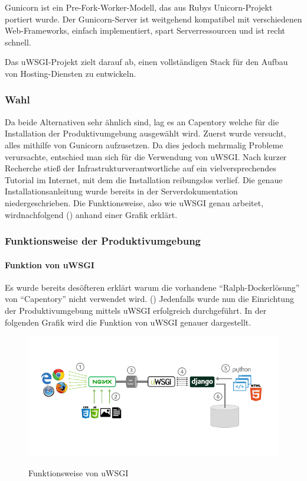 Gunicorn ist ein Pre-Fork-Worker-Modell\cite{prefork}, das aus Rubys
Unicorn-Projekt portiert wurde. Der Gunicorn-Server ist weitgehend
kompatibel mit verschiedenen Web-Frameworks, einfach implementiert,
spart Serverressourcen und ist recht schnell.

Das uWSGI-Projekt zielt darauf ab, einen vollständigen Stack für den
Aufbau von Hosting-Diensten zu entwickeln.

\hypertarget{wahl}{%
\subsubsection{Wahl}\label{wahl}}

Da beide Alternativen sehr ähnlich sind, lag es an Capentory welche für
die Installation der Produktivumgebung ausgewählt wird. Zuerst wurde
versucht, alles mithilfe von Gunicorn aufzusetzen. Da dies jedoch
mehrmalig Probleme verursachte, entschied man sich für die Verwendung
von uWSGI. Nach kurzer Recherche stieß der Infrastrukturverantwortliche
auf ein vielversprechendes Tutorial im Internet\cite{tutorialuwsgi}, mit
dem die Installation reibungslos verlief. Die genaue
Installationsanleitung wurde bereits in der Serverdokumentation
niedergeschrieben. Die Funktionsweise, also wie uWSGI genau arbeitet,
wirdnachfolgend () anhand einer Grafik
erklärt.

\hypertarget{funktionsweise-der-produktivumgebung}{%
\subsubsection{Funktionsweise der
Produktivumgebung}\label{funktionsweise-der-produktivumgebung}}

\hypertarget{funktion-von-uwsgi}{%
\paragraph{Funktion von uWSGI}\label{funktion-von-uwsgi}}

Es wurde bereits desöfteren erklärt warum die vorhandene
``Ralph-Dockerlösung'' von ``Capentory'' nicht verwendet wird.
() Jedenfalls wurde nun die
Einrichtung der Produktivumgebung mittels uWSGI erfolgreich
durchgeführt. In der folgenden Grafik wird die Funktion von uWSGI
genauer dargestellt.

\begin{figure}[ht]
\centering
\includegraphics{uwsgi.png}
\caption{Funktionsweise von uWSGI}
\cite{uwsgi}
\end{figure}

